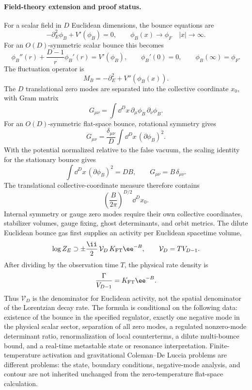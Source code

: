\paragraph{Field-theory extension and proof status.}
For a scalar field in \(D\) Euclidean dimensions, the bounce equations are
\[
  -\partial_E^2\phi_B+V'(\phi_B)=0,\qquad
  \phi_B(x)\to\phi_F\quad |x|\to\infty .
\]
For an \(O(D)\)-symmetric scalar bounce this becomes
\[
  \phi_B''(r)+\frac{D-1}{r}\phi_B'(r)=V'(\phi_B),
  \qquad
  \phi_B'(0)=0,\qquad
  \phi_B(\infty)=\phi_F .
\]
The fluctuation operator is
\begin{equation}
  M_B=-\partial_E^2+V''(\phi_B(x)).
  \label{eq:false-vacuum-field-bounce-fluctuation-operator}
\end{equation}
The \(D\) translational zero modes are separated into the collective coordinate
\(x_0\), with Gram matrix
\[
  G_{\mu\nu}
  =
  \int\dd^Dx\,
  \partial_\mu\phi_B\,\partial_\nu\phi_B .
\]
For an \(O(D)\)-symmetric flat-space bounce, rotational symmetry gives
\[
  G_{\mu\nu}
  =
  \frac{\delta_{\mu\nu}}{D}
  \int\dd^Dx\,(\partial\phi_B)^2 .
\]
With the potential normalized relative to the false vacuum, the scaling
identity for the stationary bounce gives
\[
  \int\dd^Dx\,(\partial\phi_B)^2=DB,
  \qquad
  G_{\mu\nu}=B\,\delta_{\mu\nu}.
\]
The translational collective-coordinate measure therefore contains
\[
  \left(\frac{B}{2\pi}\right)^{D/2}\dd^Dx_0 .
\]
Internal symmetry or gauge zero modes require their own collective
coordinates, stabilizer volumes, gauge fixing, ghost determinants, and orbit
metrics.  The dilute Euclidean bounce gas first supplies an activity per
Euclidean spacetime volume,
\[
  \log Z_E
  \supset
  \pm\frac{\ii}{2}\,\mathcal V_D\,K_{\rm FT}\ee^{-B},
  \qquad
  \mathcal V_D=T V_{D-1}.
\]
After dividing by the observation time \(T\), the physical rate density is
\[
  \frac{\Gamma}{V_{D-1}}
  =
  K_{\rm FT}\ee^{-B}.
\]
Thus \(\mathcal V_D\) is the denominator for Euclidean activity, not the
spatial denominator of the Lorentzian decay rate.  The formula is conditional
on the following data: existence of the bounce in the specified regulator,
exactly one negative mode in the physical scalar sector, separation of all
zero modes, a regulated nonzero-mode determinant ratio, renormalization of
local counterterms, a dilute multi-bounce bound, and a real-time metastable
state or resonance interpretation.  Finite-temperature activation and
gravitational Coleman--De Luccia problems
\cite{ColemanDeLuccia1980} are different problems: the state, boundary
conditions, negative-mode analysis, and contour are not inherited unchanged
from the zero-temperature flat-space calculation.

